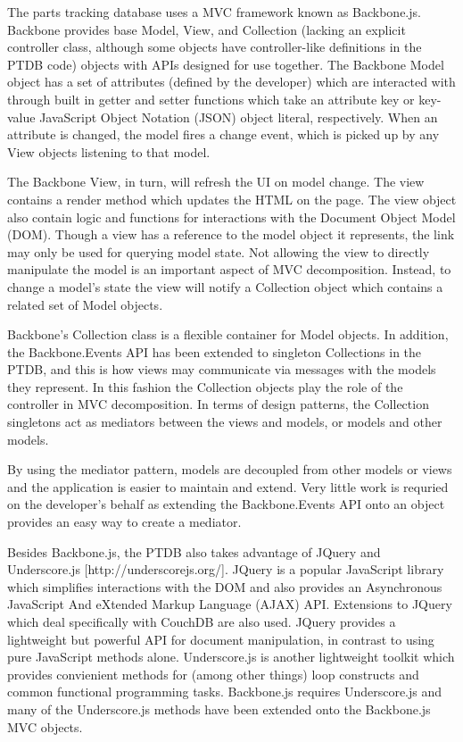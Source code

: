 \documentclass[journal]{IEEEtran}
\begin{document}
The parts tracking database uses a MVC framework known as Backbone.js. Backbone provides
base Model, View, and Collection (lacking an explicit controller class, although some objects have
controller-like definitions in the PTDB code) objects with APIs designed for use together. 
The Backbone Model 
object has a set of attributes (defined by the developer) which are interacted with through
built in getter and setter functions which take an attribute key or key-value JavaScript Object Notation (JSON) object literal,
respectively. When an attribute is changed, the model fires a change event, which is picked
up by any View objects listening to that model.

The Backbone View, in turn, will refresh the UI on model change. The view contains a render
method which updates the HTML on the page. The view object also contain logic and functions
for interactions with the Document Object Model (DOM). Though a view has a reference to the model object it represents,
the link may only be used for querying model state. Not allowing the view to directly manipulate
the model is an important aspect of MVC decomposition. Instead, to change a model's state the
view will notify a Collection object which contains a related set of Model objects.

Backbone's Collection class is a flexible container for Model objects.
In addition, the Backbone.Events API has been extended
to singleton Collections in the PTDB, and this is how views may communicate via messages
with the models they represent. In this fashion the Collection objects play the role of
the controller in MVC decomposition. In terms of design patterns, the Collection singletons 
act as mediators between the views and models, or models and other models.

By using the mediator pattern, models are decoupled from other models or views and the
application is easier to maintain and extend. Very little work is requried on the 
developer's behalf as extending the Backbone.Events API onto an object provides an
easy way to create a mediator.

Besides Backbone.js, the PTDB also takes advantage of JQuery and Underscore.js [http://underscorejs.org/].
JQuery is a popular JavaScript library which simplifies interactions with the DOM and also provides
an Asynchronous JavaScript And eXtended Markup Language (AJAX) API. Extensions to JQuery which deal specifically with CouchDB are also used.
JQuery provides a lightweight but powerful API for document manipulation, in contrast to
using pure JavaScript methods alone. Underscore.js is another lightweight toolkit which provides
convienient methods for (among other things) loop constructs and common functional programming tasks.
Backbone.js requires Underscore.js and many of the Underscore.js methods have been extended onto the 
Backbone.js MVC objects.
\end{document}

